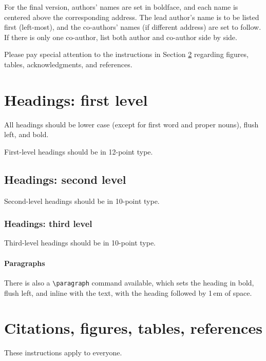 \documentclass{article}
\begin{document}
For the final version, authors' names are set in boldface, and each name is
centered above the corresponding address. The lead author's name is to be listed
first (left-most), and the co-authors' names (if different address) are set to
follow. If there is only one co-author, list both author and co-author side by
side.


Please pay special attention to the instructions in Section \ref{others}
regarding figures, tables, acknowledgments, and references.

\section{Headings: first level}
\label{headings}


All headings should be lower case (except for first word and proper nouns),
flush left, and bold.


First-level headings should be in 12-point type.


\subsection{Headings: second level}


Second-level headings should be in 10-point type.


\subsubsection{Headings: third level}


Third-level headings should be in 10-point type.


\paragraph{Paragraphs}


There is also a \verb+\paragraph+ command available, which sets the heading in
bold, flush left, and inline with the text, with the heading followed by 1\,em
of space.


\section{Citations, figures, tables, references}
\label{others}


These instructions apply to everyone.
\end{document}
